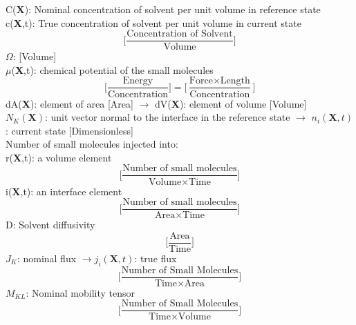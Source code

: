 \documentclass[12pt,3p]{article}
\numberwithin{equation}{section}
\begin{document}
C(\textbf{X}): Nominal concentration of solvent per unit volume in reference state \\
c(\textbf{X},t): True concentration of solvent per unit volume in current state \\
\begin{equation*}
\bigg[ \frac{\text{Concentration of Solvent}}{\text{Volume}} \bigg] 
\end{equation*}
$\Omega$: [Volume] \\
$\mu$(\textbf{X},t): chemical potential of the small molecules 
\begin{equation*}
\bigg[ \frac{\text{Energy}}{\text{Concentration}} \bigg] = \bigg[ \frac{\text{Force} \times \text{Length}}{\text{Concentration}} \bigg] 
\end{equation*}
dA(\textbf{X}): element of area [Area] $\rightarrow$ dV(\textbf{X}): element of volume [Volume] \\
$N_K (\textbf{X})$: unit vector normal to the interface in the reference state $\rightarrow$ $n_i (\textbf{X}, t)$: current state [Dimensionless] \\
Number of small molecules injected into: \\
	\indent r(\textbf{X},t): a volume element 
	\begin{equation*}
	\bigg[ \frac{\text{Number of small molecules}}{\text{Volume} \times \text{Time}} \bigg] 
	\end{equation*}
	\indent i(\textbf{X},t): an interface element 
	\begin{equation*}
	\bigg[ \frac{\text{Number of small molecules}}{\text{Area} \times \text{Time}} \bigg] 
	\end{equation*}
D: Solvent diffusivity 
\begin{equation*}
\bigg[ \frac{\text{Area}}{\text{Time}} \bigg]
\end{equation*}
$J_K$: nominal flux $\rightarrow j_i(\mathbf{X},t)$: true flux 
\begin{equation*}
\bigg[ \frac{\text{Number of Small Molecules}}{\text{Time} \times \text{Area}} \bigg] 
\end{equation*}
$M_{KL}$: Nominal mobility tensor
\begin{equation*}
\bigg[ \frac{\text{Number of Small Molecules}}{\text{Time} \times \text{Volume}} \bigg]
\end{equation*}

\newpage

\end{document}
